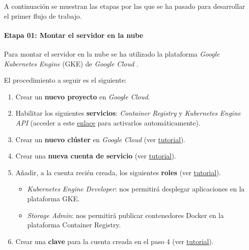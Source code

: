 A continuación se muestran las etapas por las que se ha pasado para
desarrollar el primer flujo de trabajo.

\paragraph{Etapa 01: Montar el servidor en la nube}

Para montar el servidor en la nube se ha utilizado la plataforma
\emph{Google Kubernetes Engine} (GKE) de \emph{Google Cloud} \cite{cloud:web}.

El procedimiento a seguir es el siguiente:

\begin{enumerate}
\def\labelenumi{\arabic{enumi}.}
\tightlist
\item
  Crear un \textbf{nuevo proyecto} en \emph{Google Cloud}.
\item
  Habilitar los siguientes \textbf{servicios}: \emph{Container Registry}
  y \emph{Kubernetes Engine API} (acceder a este
  \href{https://console.cloud.google.com/flows/enableapi?apiid=containerregistry.googleapis.com,container.googleapis.com}{enlace}
  para activarlos automáticamente).
\item
  Crear un \textbf{nuevo clúster} en \emph{Google Cloud} (ver
  \href{https://cloud.google.com/kubernetes-engine/docs/quickstart\#create_cluster}{tutorial}).
\item
  Crear una \textbf{nueva cuenta de servicio} (ver
  \href{https://cloud.google.com/iam/docs/creating-managing-service-accounts}{tutorial}).
\item
  Añadir, a la cuenta recién creada, los siguientes \textbf{roles} (ver
  \href{https://cloud.google.com/iam/docs/granting-roles-to-service-accounts\#granting_access_to_a_service_account_for_a_resource}{tutorial}).

  \begin{itemize}
  \tightlist
  \item
    \emph{Kubernetes Engine Developer}: nos permitirá desplegar
    aplicaciones en la plataforma GKE.
  \item
    \emph{Storage Admin}: nos permitirá publicar contenedores Docker en
    la plataforma Container Registry.
  \end{itemize}
\item
  Crear una \textbf{clave} para la cuenta creada en el paso 4 (ver
  \href{https://cloud.google.com/iam/docs/creating-managing-service-account-keys}{tutorial}).
\end{enumerate}

